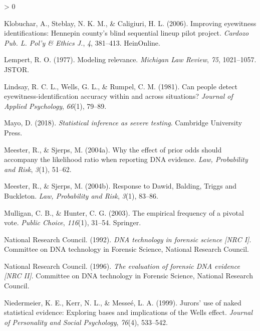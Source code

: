 \documentclass[
  10pt,
  dvipsnames,enabledeprecatedfontcommands]{scrartcl}
\newlength{\cslhangindent}
\newenvironment{CSLReferences}[2] %
 {%
  \setlength{\parindent}{0pt}
  \ifodd #1 \everypar{\setlength{\hangindent}{\cslhangindent}}\ignorespaces\fi
  \ifnum #2 > 0
  \setlength{\parskip}{#2\baselineskip}
  \fi
 }%
 {}
\begin{document}
\begin{CSLReferences}{1}{0}
\leavevmode\hypertarget{ref-klobuchar2006improving}{}%
Klobuchar, A., Steblay, N. K. M., \& Caligiuri, H. L. (2006). Improving
eyewitness identifications: Hennepin county's blind sequential lineup
pilot project. \emph{Cardozo Pub. L. Pol'y \& Ethics J.}, \emph{4},
381--413. HeinOnline.

\leavevmode\hypertarget{ref-lempert1977modeling}{}%
Lempert, R. O. (1977). Modeling relevance. \emph{Michigan Law Review},
\emph{75}, 1021--1057. JSTOR.

\leavevmode\hypertarget{ref-Lindsay1981CanPeopleDetect}{}%
Lindsay, R. C. L., Wells, G. L., \& Rumpel, C. M. (1981). Can people
detect eyewitness-identification accuracy within and across situations?
\emph{Journal of Applied Psychology}, \emph{66}(1), 79--89.

\leavevmode\hypertarget{ref-mayo2018}{}%
Mayo, D. (2018). \emph{Statistical inference as severe testing}.
Cambridge University Press.

\leavevmode\hypertarget{ref-meester2004WhyEffectPriora}{}%
Meester, R., \& Sjerps, M. (2004a). Why the effect of prior odds should
accompany the likelihood ratio when reporting {DNA} evidence. \emph{Law,
Probability and Risk}, \emph{3}(1), 51--62.

\leavevmode\hypertarget{ref-meester2004ResponseDawidBalding}{}%
Meester, R., \& Sjerps, M. (2004b). Response to {Dawid}, {Balding},
{Triggs} and {Buckleton}. \emph{Law, Probability and Risk}, \emph{3}(1),
83--86.

\leavevmode\hypertarget{ref-mulligan2003empirical}{}%
Mulligan, C. B., \& Hunter, C. G. (2003). The empirical frequency of a
pivotal vote. \emph{Public Choice}, \emph{116}(1), 31--54. Springer.

\leavevmode\hypertarget{ref-NRCI1992}{}%
National Research Council. (1992). \emph{{DNA} technology in forensic
science {\emph{{[}NRC I{]}}}}. Committee on {DNA} technology in
{F}orensic {S}cience, {N}ational {R}esearch {C}ouncil.

\leavevmode\hypertarget{ref-NRCII1996}{}%
National Research Council. (1996). \emph{The evaluation of forensic
{DNA} evidence {\emph{{[}NRC II{]}}}}. Committee on {DNA} technology in
{F}orensic {S}cience, {N}ational {R}esearch {C}ouncil.

\leavevmode\hypertarget{ref-niedermeierEtAl1999}{}%
Niedermeier, K. E., Kerr, N. L., \& Messeé, L. A. (1999). Jurors' use of
naked statistical evidence: Exploring bases and implications of the
{Wells} effect. \emph{Journal of Personality and Social Psychology},
\emph{76}(4), 533--542.


\end{CSLReferences}
\end{document}
